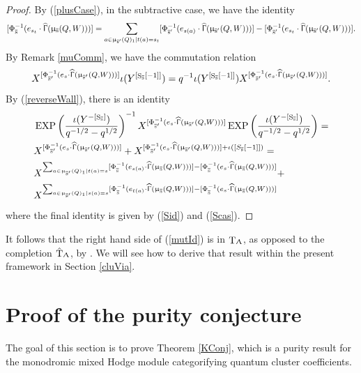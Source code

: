 \documentclass[a4paper,10pt]{amsart}
\DeclareMathOperator{\Simp}{S}
\renewcommand{\Lambda}{\Uplambda}
\renewcommand{\Gamma}{\Upgamma}
\renewcommand{\mu}{\upmu}
\DeclareMathOperator{\Tor}{T}
\DeclareMathOperator{\HGamma}{\widehat{\Gamma}}
\DeclareMathOperator{\EXP}{EXP}
\DeclareMathOperator{\Ss}{\overline{s}}
\newcommand{\pleth}[1]{\EXP\left(#1\right)}
\begin{document}
\begin{proof}
By (\ref{plusCase}), in the subtractive case, we have the identity
\begin{equation}\label{Scas}
[\Phi^{-1}_{\Ss}(e_{s_t}\cdot \HGamma(\mu_{\Ss}(Q,W)))]=\sum_{a\in \mu_{\Ss'}(Q)_1|t(a)=s_t}[\Phi_{\Ss'}^{-1}(e_{s(a)}\cdot \HGamma(\mu_{\Ss'}(Q,W)))]-[\Phi^{-1}_{\Ss'}(e_{s_t}\cdot \HGamma(\mu_{\Ss'}(Q,W)))].
\end{equation}
By Remark \ref{muComm}, we have the commutation relation
\[
X^{[\Phi^{-1}_{\Ss'}(e_s\cdot \HGamma(\mu_{\Ss'}(Q,W)))]} \iota(Y^{[\Simp_{\Ss}[-1]]})= q^{-1}\iota(Y^{[\Simp_{\Ss}[-1]]}) X^{[\Phi^{-1}_{\Ss'}(e_s\cdot \HGamma(\mu_{\Ss'}(Q,W)))]}.
\]
By (\ref{reverseWall}), there is an identity
\begin{align}
&\pleth{\frac{\iota(Y^{-[\Simp_{\Ss}]})}{q^{-1/2}-q^{1/2}}}^{- 1}X^{[\Phi^{-1}_{\Ss'}(e_s\cdot \HGamma(\mu_{\Ss'}(Q,W)))]}\pleth{\frac{\iota(Y^{-[\Simp_{\Ss}]})}{q^{-1/2}-q^{1/2}}}=\\&X^{[\Phi^{-1}_{\Ss'}(e_s\cdot \HGamma(\mu_{\Ss'}(Q,W)))]}+X^{[\Phi^{-1}_{\Ss'}(e_s\cdot \HGamma(\mu_{\Ss'}(Q,W)))]+\iota([S_{\Ss}[-1]])}=\\
\nonumber
&X^{\sum_{a\in \mu_{\Ss'}(Q)_1|t(a)=s}[\Phi_{\Ss}^{-1}(e_{s(a)}\cdot \HGamma(\mu_{\Ss}(Q,W)))]-[\Phi_{\Ss}^{-1}(e_{s}\cdot\HGamma(\mu_{\Ss}(Q,W)))]}
+\\
&X^{\sum_{a\in \mu_{\Ss'}(Q)_1|s(a)=s}[\Phi_{\Ss}^{-1}(e_{t(a)}\cdot \HGamma(\mu_{\Ss}(Q,W)))]-[\Phi_{\Ss}^{-1}(e_{s}\cdot\HGamma(\mu_{\Ss}(Q,W)))]}
\nonumber
\end{align}
where the final identity is given by (\ref{Sid}) and (\ref{Scas}).

\end{proof}
It follows that the right hand side of (\ref{mutId}) is in $\Tor_{\Lambda}$, as opposed to the completion $\hat{\Tor}_{\Lambda}$, by \cite[Cor.5.2]{BZ05}.  We will see how to derive that result within the present framework in Section \ref{cluVia}. 



\section{Proof of the purity conjecture}

The goal of this section is to prove Theorem \ref{KConj}, which is a purity result for the monodromic mixed Hodge module categorifying quantum cluster coefficients.
\end{document}
